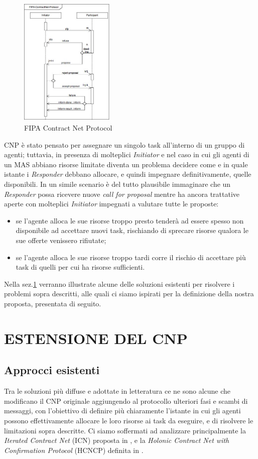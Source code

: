 \documentclass[a4paper, 10pt, conference]{ieeeconf} %
\begin{document}
\begin{figure}[!b]
\centering
\includegraphics[width=0.4\textwidth]{fipa_cn.png}
\caption{FIPA Contract Net Protocol} \label{f1}
\end{figure}

CNP è stato pensato per assegnare un singolo task all'interno di un gruppo di agenti; tuttavia, in presenza di molteplici \emph{Initiator} e nel caso in cui gli agenti di un MAS abbiano risorse limitate diventa un problema decidere come e in quale istante i \emph{Responder} debbano allocare, e quindi impegnare definitivamente, quelle disponibili. In un simile scenario è del tutto plausibile immaginare che un \emph{Responder} possa ricevere nuove \emph{call for proposal} mentre ha ancora trattative aperte con molteplici \emph{Initiator} impegnati a valutare tutte le proposte:
\begin{itemize}
\item{se l'agente alloca le sue risorse troppo presto tenderà ad essere spesso non disponibile ad accettare nuovi task, rischiando di sprecare risorse qualora le sue offerte venissero rifiutate;}
\item{se l'agente alloca le sue risorse troppo tardi corre il rischio di accettare più task di quelli per cui ha risorse sufficienti.}
\end{itemize}
Nella sez.\ref{s1} verranno illustrate alcune delle soluzioni esistenti per risolvere i problemi sopra descritti, alle quali ci siamo ispirati per la definizione della nostra proposta, presentata di seguito.

\section{ESTENSIONE DEL CNP} \label{s1}
\subsection*{Approcci esistenti} \label{ss1}
Tra le soluzioni più diffuse e adottate in letteratura ce ne sono alcune che modificano il CNP originale aggiungendo al protocollo ulteriori fasi e scambi di messaggi, con l'obiettivo di definire più chiaramente l'istante in cui gli agenti possono effettivamente allocare le loro risorse ai task da eseguire, e di risolvere le limitazioni sopra descritte. Ci siamo soffermati ad analizzare principalmente la \emph{Iterated Contract Net} (ICN) proposta in \cite{c4}, e la \emph{Holonic Contract Net with Confirmation Protocol} (HCNCP) definita in \cite{c5}.
\end{document}
